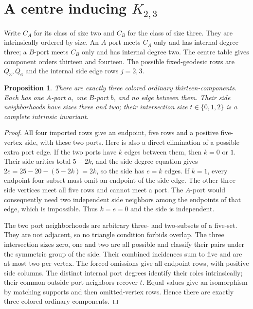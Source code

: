 \documentclass[11pt]{article}
\newtheorem{proposition}[theorem]{Proposition}
\begin{document}
\section{A centre inducing $K_{2,3}$}

Write $C_A$ for its class of size two and $C_B$ for the class of size
three. They are intrinsically ordered by size. An $A$-port meets $C_A$
only and has internal degree three; a $B$-port meets $C_B$ only and has
internal degree two. The centre table gives component orders thirteen
and fourteen. The possible fixed-geodesic rows are $Q_3,Q_6$ and the
internal side edge rows $j=2,3$.

\begin{proposition}\label{k23thirteen}
There are exactly three colored ordinary thirteen-components. Each has
one $A$-port $a$, one $B$-port $b$, and no edge between them. Their
side neighborhoods have sizes three and two; their intersection size
$t\in\{0,1,2\}$ is a complete intrinsic invariant.
\end{proposition}
\begin{proof}
All four imported rows give an endpoint, five rows and a positive
five-vertex side, with these two ports. Here is also a direct elimination
of a possible extra port edge. If the two ports have $k$ edges between
them, then $k=0$ or $1$. Their side arities total $5-2k$, and the
side degree equation gives $2e=25-20-(5-2k)=2k$, so the side has $e=k$
edges. If $k=1$, every endpoint four-subset must omit an endpoint of
the side edge. The other three side vertices meet all five rows and
cannot meet a port. The $A$-port would consequently need two independent
side neighbors among the endpoints of that edge, which is impossible.
Thus $k=e=0$ and the side is independent.

The two port neighborhoods are arbitrary three- and two-subsets of a
five-set. They are not adjacent, so no triangle condition forbids overlap.
The three intersection sizes zero, one and two are all possible and
classify their pairs under the symmetric group of the side. Their
combined incidences sum to five and are at most two per vertex. The
forced omissions give all endpoint rows, with positive side columns.
The distinct internal port degrees identify their roles intrinsically;
their common outside-port neighbors recover $t$. Equal values give an
isomorphism by matching supports and then omitted-vertex rows. Hence
there are exactly three colored ordinary components.
\end{proof}
\end{document}
